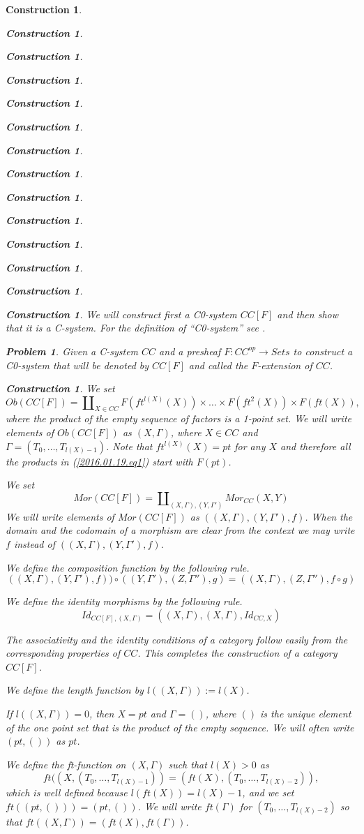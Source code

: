 \documentclass[onecolumn,12pt]{amsart}
\numberwithin{proposition}{subsection}
\newtheorem{problem}[proposition]{Problem}
\newtheorem{construction}[proposition]{Construction}
\newcommand{\sr}{\rightarrow}
\begin{document}
\begin{construction}
\begin{construction}
\begin{construction}
\begin{construction}
\begin{construction}
\begin{construction}
\begin{construction}
\begin{construction}
\begin{construction}
\begin{construction}
\begin{construction}
\begin{construction}
\begin{construction}
\begin{construction}
We will construct first a C0-system $CC[F]$ and then show that it is a
C-system. For the definition of ``C0-system'' see \cite[Definition
  2.1]{Csubsystems}.
%
\begin{problem}\label{2016.01.19.prob1}
Given a C-system $CC$ and a presheaf $F:CC^{op}\sr Sets$ to construct a
C0-system that will be denoted by $CC[F]$ and called the {\em $F$-extension of $CC$}.
\end{problem}
%
\begin{construction}\rm\label{2016.01.19.constr1}
We set 
%
\begin{equation}\label{2016.01.19.eq1}
Ob(CC[F])=\amalg_{X\in CC} F(ft^{l(X)}(X))\times\dots\times F(ft^2(X))\times
F(ft(X)),
\end{equation}%
%
where the product of the empty sequence of factors is a 1-point set. We will
write elements of $Ob(CC[F])$ as $(X,\Gamma)$, where $X\in CC$ and
$\Gamma=(T_0,\dots,T_{l(X)-1})$. Note that $ft^{l(X)}(X)=pt$ for any $X$ and
therefore all the products in (\ref{2016.01.19.eq1}) start with $F(pt)$.

We set
%
$$Mor(CC[F])=\amalg_{(X,\Gamma),(Y,\Gamma')}Mor_{CC}(X,Y)$$
%
We will write elements of $Mor(CC[F])$ as $((X,\Gamma),(Y,\Gamma'),f)$. When
the domain and the codomain of a morphism are clear from the context we may
write $f$ instead of $((X,\Gamma),(Y,\Gamma'),f)$.

We define the composition function by the following rule.
%
$$((X,\Gamma),(Y,\Gamma'),f))\circ ((Y,\Gamma'),(Z,\Gamma''),g)=((X,\Gamma),(Z,\Gamma''),f\circ g)$$

We define the identity morphisms by the following rule.
%
$$Id_{CC[F],(X,\Gamma)}=((X,\Gamma),(X,\Gamma),Id_{CC,X})$$
%

The associativity and the identity conditions of a category follow easily from
the corresponding properties of $CC$. This completes the construction of a
category $CC[F]$.

We define the length function by $l((X,\Gamma)):=l(X)$.

If $l((X,\Gamma))=0$, then $X=pt$ and $\Gamma=()$, where $()$ is the unique
element of the one point set that is the product of the empty sequence. We will
often write $(pt,())$ as $pt$.

We define the ft-function on $(X,\Gamma)$ such that $l(X)>0$ as 
%
$$ft((X,(T_0,\dots,T_{l(X)-1}))=(ft(X),(T_0,\dots,T_{l(X)-2})),$$
%
which is well defined because $l(ft(X))=l(X)-1$, and we set
$ft((pt,()))=(pt,())$. We will write $ft(\Gamma)$ for $(T_0,\dots,T_{l(X)-2})$
so that $ft((X,\Gamma))=(ft(X),ft(\Gamma))$.


\end{construction}
\end{construction}
\end{construction}
\end{construction}
\end{construction}
\end{construction}
\end{construction}
\end{construction}
\end{construction}
\end{construction}
\end{construction}
\end{construction}
\end{construction}
\end{construction}
\end{construction}
\end{document}
